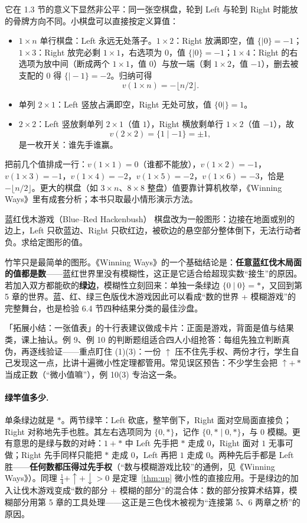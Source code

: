 \documentclass[UTF8,a4paper,11pt,oneside,openany,fontset=fandol]{ctexbook}
\theoremstyle{definition}
\begin{document}
它在 1.3 节的意义下显然非公平：同一张空棋盘，轮到 Left 与轮到 Right 时能放的骨牌方向不同。小棋盘可以直接按定义算值：
\begin{itemize}
\item $1\times n$ 单行棋盘：Left 永远无处落子。$1\times2$：Right 放满即空，值 $\{\mid 0\}=-1$；$1\times3$：Right 放完必剩 $1\times1$，右选项为 $0$，值 $\{\mid 0\}=-1$；$1\times4$：Right 的右选项为放中间（断成两个 $1\times1$，值 $0$）与放一端（剩 $1\times2$，值 $-1$），删去被支配的 $0$ 得 $\{\mid -1\}=-2$。归纳可得
\[
 v(1\times n)=-\bigl\lfloor n/2\bigr\rfloor .
\]
\item 单列 $2\times1$：Left 竖放占满即空，Right 无处可放，值 $\{0\mid\}=1$。
\item $2\times2$：Left 竖放剩单列 $2\times1$（值 $1$），Right 横放剩单行 $1\times2$（值 $-1$），故
\[
 v(2\times2)=\{1\mid -1\}=\pm1 ,
\]
是一枚开关：谁先手谁赢。
\end{itemize}
把前几个值排成一行：$v(1\times1)=0$（谁都不能放），$v(1\times2)=-1$，$v(1\times3)=-1$，$v(1\times4)=-2$，$v(1\times5)=-2$，$v(1\times6)=-3$，恰是 $-\lfloor n/2\rfloor$。更大的棋盘（如 $3\times n$、$8\times8$ 整盘）值要靠计算机枚举，《Winning Ways》里有成套分析；本书只取最小情形演示方法。

\begin{problem}{蓝红伐木游戏（Blue--Red Hackenbush）}
棋盘改为一般图形：边接在地面或别的边上，Left 只砍蓝边、Right 只砍红边，被砍边的悬空部分整体倒下，无法行动者负。求给定图形的值。
\end{problem}

竹竿只是最简单的图形。《Winning Ways》的一个基础结论是：\textbf{任意蓝红伐木局面的值都是数}——蓝红世界里没有模糊性，这正是它适合给超现实数“接生”的原因。若加入双方都能砍的\textbf{绿边}，模糊性立刻回来：单独一条绿边 $\{0\mid 0\}=\ast$，又回到第 5 章的世界。蓝、红、绿三色版伐木游戏因此可以看成“数的世界 + 模糊游戏”的完整舞台，也是检验 6.4 节四种结果分类的最佳沙盘。

\begin{teach}[值表与判断题组的课堂用法]
「拓展小结：一张值表」的十行表建议做成卡片：正面是游戏，背面是值与结果类，课上抽认。例 9、例 10 的判断题组适合四人小组抢答：每组先独立判断真伪，再逐线验证——重点盯住 (1)(3)：一份 $\uparrow$ 压不住先手权、两份才行，学生自己发现这一点，比讲十遍微小性定理都管用。常见误区预告：不少学生会把 $\uparrow+\ast$ 当成正数（“微小值嘛”），例 10(3) 专治这一条。
\end{teach}
\paragraph{绿竿值多少.} 单条绿边就是 $\ast$。两节绿竿：Left 砍底，整竿倒下，Right 面对空局面直接负；Right 对称地先手也胜。其左右选项同为 $\{0,\ast\}$，记作 $\{0,\ast\mid 0,\ast\}$，与 $0$ 模糊。更有意思的是绿与数的对峙：$1+\ast$ 中 Left 先手把 $\ast$ 走成 $0$，Right 面对 $1$ 无事可做；Right 先手同样只能把 $\ast$ 走成 $0$，Left 再把 $1$ 走成 $0$。两种先后手都是 Left 胜——\textbf{任何数都压得过先手权}（“数与模糊游戏比较”的通例，见《Winning Ways》）。同理 $\tfrac14+\uparrow+\downarrow>0$ 是定理~\ref{thm:up} 微小性的直接应用。于是绿边的加入让伐木游戏变成“数的部分 + 模糊的部分”的混合体：数的部分按算术结算，模糊部分用第 5 章的工具处理——这正是三色伐木被视为“连接第 5、6 两章之桥”的原因。
\end{document}
